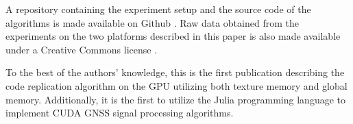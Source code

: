 \documentclass{juliacon}
\begin{document}
A repository containing the experiment setup and the source code of the algorithms is made available on Github \cite{Ozmaden2022}. Raw data obtained from the experiments on the two platforms described in this paper is also made available under a Creative Commons license \cite{Ozmaden2022_2}.

To the best of the authors' knowledge, this is the first publication describing the code replication algorithm on the GPU utilizing both texture memory and global memory. Additionally, it is the first to utilize the Julia programming language to implement CUDA GNSS signal processing algorithms.



\end{document}
